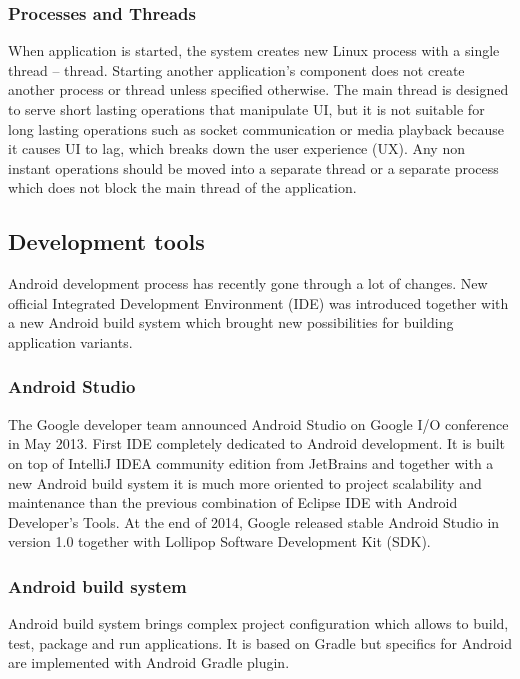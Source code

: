 \subsubsection{Processes and Threads}
When application is started, the system creates new Linux process with a single thread --  thread. Starting another application's component does not create another process or thread unless specified otherwise. The main thread is designed to serve short lasting operations that manipulate UI, but it is not suitable for long lasting operations such as socket communication or media playback because it causes UI to lag, which breaks down the user experience (UX). Any non instant operations should be moved into a separate thread or a separate process which does not block the main thread of the application.

\subsection{Development tools}
Android development process has recently gone through a lot of changes. New official Integrated Development Environment (IDE) was introduced together with a new Android build system which brought new possibilities for building application variants.


\subsubsection{Android Studio}
The Google developer team announced Android Studio on Google I/O conference in May 2013. First IDE completely dedicated to Android development. It is built on top of IntelliJ IDEA community edition from JetBrains and together with a new Android build system it is much more oriented to project scalability and maintenance than the previous combination of Eclipse IDE with Android Developer's Tools. At the end of 2014, Google released stable Android Studio in version 1.0 together with Lollipop Software Development Kit (SDK).

\subsubsection{Android build system}
Android build system brings complex project configuration which allows to build, test, package and run applications. It is based on Gradle but specifics for Android are implemented with Android Gradle plugin.

